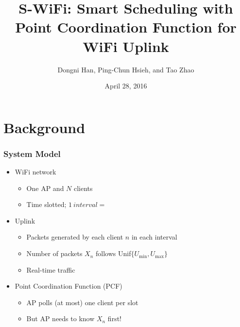 \documentclass{beamer}
\begin{document}
\title{S-WiFi: Smart Scheduling with Point Coordination Function for WiFi Uplink}
\author{Dongni Han, Ping-Chun Hsieh, and Tao Zhao}
\date{April 28, 2016}
\newtheorem{thm}{Theorem}
\begin{frame}
\titlepage
\end{frame}





\section{Background}

\begin{frame}
\frametitle{System Model}
\begin{itemize}
  \item WiFi network
    \begin{itemize}
      \item One AP and $N$ clients
      \item Time slotted; $\SI{1}{interval} =$ 
    \end{itemize}
  \item Uplink
    \begin{itemize}
      \item Packets generated by each client $n$ in each interval
      \item Number of packets $X_n$ follows Unif$\{U_\text{min}, U_\text{max}\}$
      \item Real-time traffic
    \end{itemize}
  \item Point Coordination Function (PCF)
    \begin{itemize}
      \item AP polls (at most) one client per slot
      \item But AP needs to know $X_n$ first!
    \end{itemize}
\end{itemize}
\end{frame}
\end{document}

